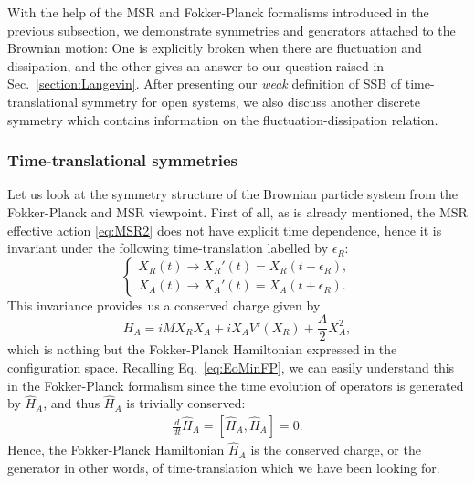 \documentclass[a4paper,11pt]{article}
\begin{document}
With the help of the MSR and Fokker-Planck formalisms introduced in the previous 
subsection, we demonstrate symmetries and generators attached to 
the Brownian motion: 
One is explicitly broken when there are fluctuation and dissipation, 
and the other gives an answer to our question raised 
in Sec.~\ref{section:Langevin}.
After presenting our \textit{weak} definition of SSB of 
time-translational symmetry for open systems, we also discuss 
another discrete symmetry which contains information on 
the fluctuation-dissipation relation.


\subsubsection{Time-translational symmetries}
\label{sec:TimeTrSym}
Let us look at the symmetry structure of the Brownian particle system 
from the Fokker-Planck and MSR viewpoint. 
First of all, as is already mentioned, the MSR effective action \eqref{eq:MSR2} 
does not have explicit time dependence, hence it is invariant under the following time-translation labelled by $\epsilon_R$:
\begin{equation}
 \begin{cases}
  X_R (t) \to X_R' (t) = X_R ( t + \epsilon_R ), \\ 
  X_A (t) \to X_A' (t) = X_A ( t + \epsilon_R ).
 \end{cases}
 \label{eq:Timetr1}
\end{equation}
This invariance provides us a conserved charge given by
\begin{equation}
  H_A 
  = i M\dot{X}_R \dot{X}_A + i X_A V'(X_R) + \frac{A}{2} X_A^2 ,
\end{equation}
which is nothing but the Fokker-Planck Hamiltonian expressed 
in the configuration space.
Recalling Eq.~\eqref{eq:EoMinFP}, 
we can easily understand this in the Fokker-Planck formalism since 
the time evolution of operators is generated by $\hat{H}_A$, 
and thus $\hat{H}_A$ is trivially conserved:
\begin{align}
\frac{d }{dt}\hat H_{A}=[\hat H_{A},\hat H_{A}]=0.
\end{align}
Hence, the Fokker-Planck Hamiltonian $\hat H_{A}$ is 
the conserved charge, or the generator in other words, of time-translation 
which we have been looking for.
\end{document}
